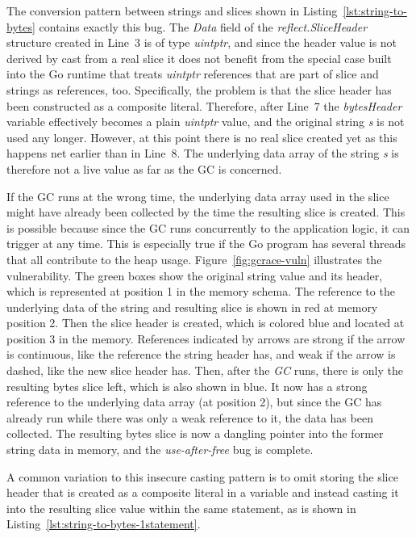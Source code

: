 The conversion pattern between strings and slices shown in Listing~\ref{lst:string-to-bytes} contains exactly this bug.
The \textit{Data} field of the \textit{reflect.SliceHeader} structure created in Line~3 is of type \textit{uintptr}, and
since the header value is not derived by cast from a real slice it does not benefit from the special case built into the
Go runtime that treats \textit{uintptr} references that are part of slice and strings as references, too.
Specifically, the problem is that the slice header has been constructed as a composite literal.
Therefore, after Line~7 the \textit{bytesHeader} variable effectively becomes a plain \textit{uintptr} value, and the
original string \textit{s} is not used any longer.
However, at this point there is no real slice created yet as this happens net earlier than in Line~8.
The underlying data array of the string \textit{s} is therefore not a live value as far as the \acrshort{GC} is
concerned.



If the \acrshort{GC} runs at the wrong time, the underlying data array used in the slice might have already been
collected by the time the resulting slice is created.
This is possible because since the \acrshort{GC} runs concurrently to the application logic, it can trigger at any time.
This is especially true if the Go program has several threads that all contribute to the heap usage.
Figure~\ref{fig:gcrace-vuln} illustrates the vulnerability.
The green boxes show the original string value and its header, which is represented at position 1 in the memory schema.
The reference to the underlying data of the string and resulting slice is shown in red at memory position 2.
Then the slice header is created, which is colored blue and located at position 3 in the memory.
References indicated by arrows are strong if the arrow is continuous, like the reference the string header has, and
weak if the arrow is dashed, like the new slice header has.
Then, after the \textit{GC} runs, there is only the resulting bytes slice left, which is also shown in blue.
It now has a strong reference to the underlying data array (at position 2), but since the \acrshort{GC} has already run
while there was only a weak reference to it, the data has been collected.
The resulting bytes slice is now a dangling pointer into the former string data in memory, and the
\textit{use-after-free} bug is complete.

A common variation to this insecure casting pattern is to omit storing the slice header that is created as a composite
literal in a variable and instead casting it into the resulting slice value within the same statement, as is shown in
Listing~\ref{lst:string-to-bytes-1statement}.

